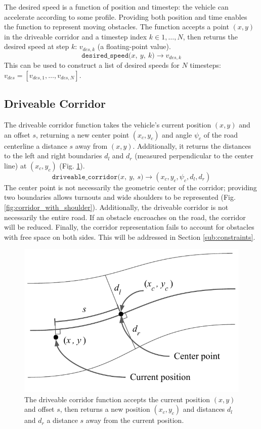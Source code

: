 \documentclass[letterpaper, 10 pt, conference]{ieeeconf}  %
\begin{document}
The desired speed is a function of position and timestep: the vehicle can accelerate according to some profile. Providing both position and time enables the function to represent moving obstacles.
The function accepts a point $(x, y)$ in the driveable corridor and a timestep index $k \in 1,\dots,N$, then returns the desired speed at step $k$: $v_{des,k}$ (a floating-point value).
%
$$\texttt{desired\_speed($x,\ y,\ k$)}\rightarrow v_{des,k}$$
This can be used to construct a list of desired speeds for $N$ timesteps: $v_{des} = [v_{des,1},\dots,v_{des,N}]$.



\subsection{Driveable Corridor} \label{sub:corridor}

The driveable corridor function takes the vehicle's current position $(x,y)$ and an offset $s$, returning a new center point $(x_c, y_c)$ and angle $\psi_c$ of the road centerline a distance $s$ away from $(x,y)$. Additionally, it returns the distances to the left and right boundaries $d_l$ and $d_r$ (measured perpendicular to the center line) at $(x_c, y_c)$ (Fig. \ref{fig:corridor}).
%
$$\texttt{driveable\_corridor($x,\ y,\ s$)} \rightarrow (x_c, y_c, \psi_c, d_l, d_r)$$
%
The center point is not necessarily the geometric center of the corridor; providing two boundaries allows turnouts and wide shoulders to be represented (Fig. \ref{fig:corridor_with_shoulder}). 
Additionally, the driveable corridor is not necessarily the entire road. If an obstacle encroaches on the road, the corridor will be reduced.
Finally, the corridor representation fails to account for obstacles with free space on both sides. This will be addressed in Section \ref{sub:constraints}.


\begin{figure}[h]
	\centering
	\includegraphics[width=0.9\linewidth]{figures/corridor.pdf}
	\caption{The driveable corridor function accepts the current position $(x,y)$ and offset $s$, then returns a new position $(x_c, y_c)$ and distances $d_l$ and $d_r$ a distance $s$ away from the current position.}
	\label{fig:corridor}
\end{figure}
\end{document}
